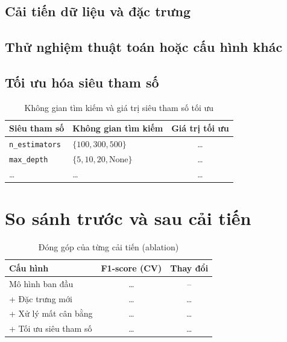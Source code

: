 \documentclass[12pt,a4paper,oneside]{report}
\begin{document}
\subsection{Cải tiến dữ liệu và đặc trưng}

\subsection{Thử nghiệm thuật toán hoặc cấu hình khác}

\subsection{Tối ưu hóa siêu tham số}

\begin{table}[H]
  \centering
  \caption{Không gian tìm kiếm và giá trị siêu tham số tối ưu}
  \label{tab:sieuthamso}
  \begin{tabular}{llc}
    \toprule
    \textbf{Siêu tham số} & \textbf{Không gian tìm kiếm} & \textbf{Giá trị tối ưu} \\
    \midrule
    \texttt{n\_estimators} & $\{100, 300, 500\}$   & \dots \\
    \texttt{max\_depth}    & $\{5, 10, 20, \text{None}\}$ & \dots \\
    \dots & \dots & \dots \\
    \bottomrule
  \end{tabular}
\end{table}

\section{So sánh trước và sau cải tiến}

\begin{table}[H]
  \centering
  \caption{Đóng góp của từng cải tiến (ablation)}
  \label{tab:ablation}
  \begin{tabular}{lcc}
    \toprule
    \textbf{Cấu hình} & \textbf{F1-score (CV)} & \textbf{Thay đổi} \\
    \midrule
    Mô hình ban đầu                      & \dots & -- \\
    + Đặc trưng mới                      & \dots & \dots \\
    + Xử lý mất cân bằng                 & \dots & \dots \\
    + Tối ưu siêu tham số                & \dots & \dots \\
    \bottomrule
  \end{tabular}
\end{table}
\end{document}

